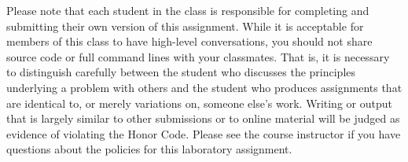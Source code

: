
Please note that each student in the class is responsible for completing and submitting their own version of this
assignment. While it is acceptable for members of this class to have high-level conversations, you should not share
source code or full command lines with your classmates.  That is, it is necessary to distinguish carefully between the
student who discusses the principles underlying a problem with others and the student who produces assignments that are
identical to, or merely variations on, someone else's work.  Writing or output that is largely similar to other
submissions or to online material will be judged as evidence of violating the Honor Code. Please see the course
instructor if you have questions about the policies for this laboratory assignment.


